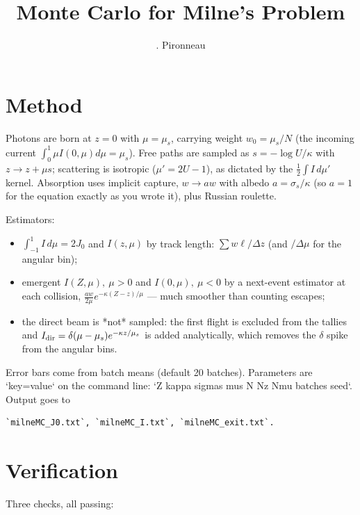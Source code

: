 \documentclass[11pt,a4paper]{article}
\title{Monte Carlo for Milne's Problem}
\author{. Pironneau}
\date{}
\theoremstyle{remark}
\begin{document}
\maketitle


\section{Method} Photons are born at $z=0$ with $\mu=\mu_s$, carrying weight $w_0=\mu_s/N$ (the incoming current $\int_0^1\mu I(0,\mu)d\mu=\mu_s$). Free paths are sampled as $s=-\log U/\kappa$ with $z\!\to\!z+\mu s$; scattering is isotropic ($\mu'=2U-1$), as dictated by the $\frac12\int I\,d\mu'$ kernel. Absorption uses implicit capture, $w\to a w$ with albedo $a=\sigma_s/\kappa$ (so $a=1$ for the equation exactly as you wrote it), plus Russian roulette. 

Estimators:
\begin{itemize}
\item $\int_{-1}^{1} I\,d\mu = 2J_0$ and $I(z,\mu)$ by track length: $\sum w\ell/\Delta z$ (and $/\Delta\mu$ for the angular bin);
\item emergent $I(Z,\mu),\ \mu>0$ and $I(0,\mu),\ \mu<0$ by a next-event estimator at each collision, $\frac{aw}{2\mu}e^{-\kappa(Z-z)/\mu}$ — much smoother than counting escapes;
\item the direct beam is *not* sampled: the first flight is excluded from the tallies and $I_{\rm dir}=\delta(\mu-\mu_s)e^{-\kappa z/\mu_s}$ is added analytically, which removes the $\delta$ spike from the angular bins.
\end{itemize}
Error bars come from batch means (default 20 batches). Parameters are `key=value` on the command line: `Z kappa sigmas mus N Nz Nmu batches seed`. Output goes to 
\begin{verbatim}
`milneMC_J0.txt`, `milneMC_I.txt`, `milneMC_exit.txt`.
\end{verbatim}

\section{Verification} Three checks, all passing:
\end{document}
